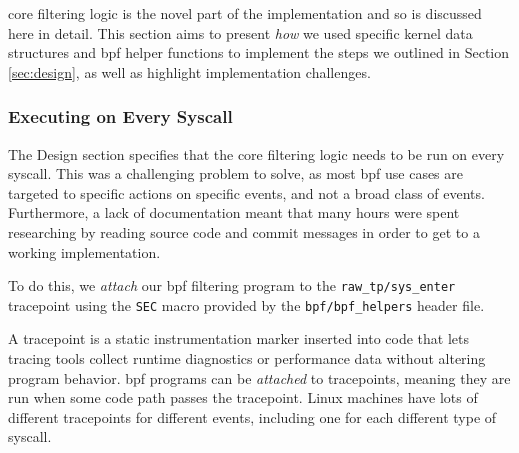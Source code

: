 \afg core filtering logic is the novel part of the implementation and so is
discussed here in detail. This section aims to present \textit{how} we used
specific kernel data structures and \ac{bpf} helper functions to implement the
steps we outlined in Section \ref{sec:design}, as well as highlight
implementation challenges.

\subsubsection{Executing on Every Syscall}

The Design section specifies that the core filtering logic needs to be run on
every syscall. This was a challenging problem to solve, as most \ac{bpf}
use cases are targeted to specific actions on specific events, and not a broad
class of events. Furthermore, a lack of documentation meant that many hours were
spent researching by reading source code and commit messages in order to get to
a working implementation.

To do this, we \textit{attach} our \ac{bpf} filtering program to
the \texttt{raw\_tp/sys\_enter} tracepoint using the \texttt{SEC} macro provided
by the \texttt{bpf/bpf\_helpers} header file.

A tracepoint is a static instrumentation marker inserted into code that lets tracing 
tools collect runtime diagnostics or performance data without altering program 
behavior. \ac{bpf} programs can be \textit{attached} to tracepoints, meaning they 
are run when some code path passes the tracepoint. Linux machines have lots of 
different tracepoints for different events, including one for each different type of 
syscall. 


